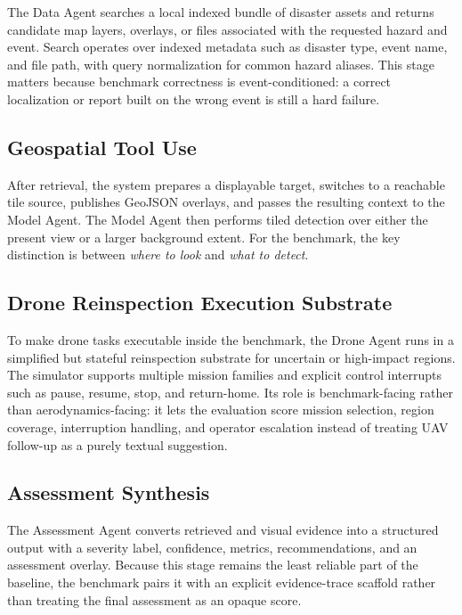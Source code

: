 \documentclass{article}
\begin{document}
The Data Agent searches a local indexed bundle of disaster assets and returns candidate map layers, overlays, or files associated with the requested hazard and event. Search operates over indexed metadata such as disaster type, event name, and file path, with query normalization for common hazard aliases. This stage matters because benchmark correctness is event-conditioned: a correct localization or report built on the wrong event is still a hard failure.

\subsection{Geospatial Tool Use}

After retrieval, the system prepares a displayable target, switches to a reachable tile source, publishes GeoJSON overlays, and passes the resulting context to the Model Agent. The Model Agent then performs tiled detection over either the present view or a larger background extent. For the benchmark, the key distinction is between \emph{where to look} and \emph{what to detect}.

\subsection{Drone Reinspection Execution Substrate}

To make drone tasks executable inside the benchmark, the Drone Agent runs in a simplified but stateful reinspection substrate for uncertain or high-impact regions. The simulator supports multiple mission families and explicit control interrupts such as pause, resume, stop, and return-home. Its role is benchmark-facing rather than aerodynamics-facing: it lets the evaluation score mission selection, region coverage, interruption handling, and operator escalation instead of treating UAV follow-up as a purely textual suggestion.

\subsection{Assessment Synthesis}

The Assessment Agent converts retrieved and visual evidence into a structured output with a severity label, confidence, metrics, recommendations, and an assessment overlay. Because this stage remains the least reliable part of the baseline, the benchmark pairs it with an explicit evidence-trace scaffold rather than treating the final assessment as an opaque score.
\end{document}
